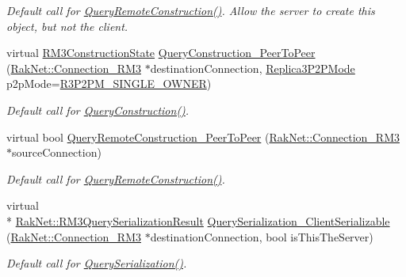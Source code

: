 \begin{DoxyCompactItemize}
\begin{DoxyCompactList}\small\item\em Default call for \hyperlink{class_rak_net_1_1_replica3_a79bd207fb79055d2b39943eb1c6b1f58}{Query\-Remote\-Construction()}. Allow the server to create this object, but not the client. \end{DoxyCompactList}\item 
virtual \hyperlink{group___r_e_p_l_i_c_a___m_a_n_a_g_e_r___g_r_o_u_p3_ga16aaecf3c23582f0de6652b348ccfa38}{R\-M3\-Construction\-State} \hyperlink{class_rak_net_1_1_replica3_abd7b33c48572729b624485e69e1f0fe2}{Query\-Construction\-\_\-\-Peer\-To\-Peer} (\hyperlink{class_rak_net_1_1_connection___r_m3}{Rak\-Net\-::\-Connection\-\_\-\-R\-M3} $\ast$destination\-Connection, \hyperlink{group___r_e_p_l_i_c_a___m_a_n_a_g_e_r___g_r_o_u_p3_ga91a588da9d58bc86b8fb7e4f27ddcf7e}{Replica3\-P2\-P\-Mode} p2p\-Mode=\hyperlink{group___r_e_p_l_i_c_a___m_a_n_a_g_e_r___g_r_o_u_p3_gga91a588da9d58bc86b8fb7e4f27ddcf7eae6bb229afa26313b6aa4c11320e630d5}{R3\-P2\-P\-M\-\_\-\-S\-I\-N\-G\-L\-E\-\_\-\-O\-W\-N\-E\-R})
\begin{DoxyCompactList}\small\item\em Default call for \hyperlink{class_rak_net_1_1_replica3_ad826e04ce6a0db4e32c3d990fd27e943}{Query\-Construction()}. \end{DoxyCompactList}\item 
virtual bool \hyperlink{class_rak_net_1_1_replica3_a6f398550955711b0a2b8366ca6627835}{Query\-Remote\-Construction\-\_\-\-Peer\-To\-Peer} (\hyperlink{class_rak_net_1_1_connection___r_m3}{Rak\-Net\-::\-Connection\-\_\-\-R\-M3} $\ast$source\-Connection)
\begin{DoxyCompactList}\small\item\em Default call for \hyperlink{class_rak_net_1_1_replica3_a79bd207fb79055d2b39943eb1c6b1f58}{Query\-Remote\-Construction()}. \end{DoxyCompactList}\item 
virtual \\*
\hyperlink{group___r_e_p_l_i_c_a___m_a_n_a_g_e_r___g_r_o_u_p3_ga9a29b413d7f2b9cb21c16457631d3aef}{Rak\-Net\-::\-R\-M3\-Query\-Serialization\-Result} \hyperlink{class_rak_net_1_1_replica3_a8af3a3d3cee9098378deea019710852c}{Query\-Serialization\-\_\-\-Client\-Serializable} (\hyperlink{class_rak_net_1_1_connection___r_m3}{Rak\-Net\-::\-Connection\-\_\-\-R\-M3} $\ast$destination\-Connection, bool is\-This\-The\-Server)
\begin{DoxyCompactList}\small\item\em Default call for \hyperlink{class_rak_net_1_1_replica3_abc1b2daa5c1a908ddd2d6df44da7e9aa}{Query\-Serialization()}. \end{DoxyCompactList}\item 

\end{DoxyCompactItemize}
